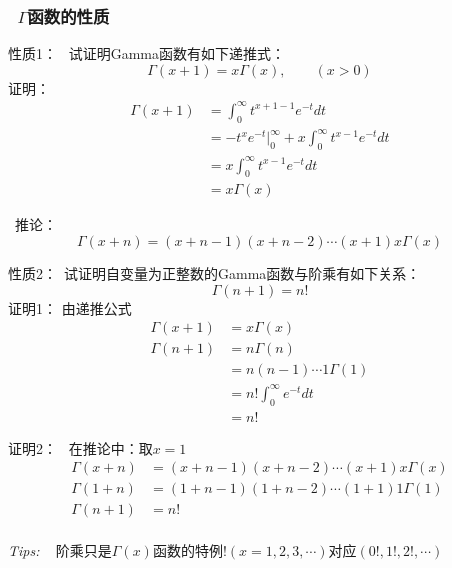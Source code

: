 \begin{frame}	
	\frametitle{~$\Gamma$函数的性质}
	\alert{性质1：} ~试证明Gamma函数有如下递推式：
		\[\Gamma(x+1)=x \Gamma(x),\qquad (x>0)\]
	\alert{证明：}  
	\begin{equation*}
	\begin{split}
		\Gamma(x+1)&= \int_{0}^{\infty} t^{x+1-1} e^{-t} dt \\
		&= -t^x e^{-t} |_0 ^\infty + x \int_{0}^{\infty} t^{x-1} e^{-t} dt \\
		&= x \int_{0}^{\infty} t^{x-1} e^{-t} dt \\
		&=x \Gamma(x)
	\end{split}
	\end{equation*}	
\end{frame}	

\begin{frame}
	 推论： 
	\begin{equation*}
		\Gamma(x+n)=(x+n-1)(x+n-2)\cdots (x+1)x\Gamma(x)
	\end{equation*}	 
\end{frame}	

\begin{frame}
	\alert{性质2：}~试证明自变量为正整数的Gamma函数与阶乘有如下关系：
	\begin{equation*}
		\Gamma(n+1)=n!
	\end{equation*}	
	\alert{证明1：}  由递推公式
	\begin{equation*}
	\begin{split}
		\Gamma(x+1)&=x \Gamma(x) \\
		\Gamma(n+1)&=n \Gamma(n) \\
		&=n(n-1)\cdots 1 \Gamma(1) \\
		&=n! \int_{0}^{\infty}  e^{-t} dt \\
		&=n!
	\end{split}
	\end{equation*}	
\end{frame}	

\begin{frame}
	\alert{证明2：}  	 在推论中：取$x=1$
	\begin{equation*}
	\begin{split}	
		\Gamma(x+n)&=(x+n-1)(x+n-2)\cdots (x+1)x\Gamma(x)\\
		\Gamma(1+n)&=(1+n-1)(1+n-2)\cdots (1+1)1\Gamma(1)\\
		\Gamma(n+1)&=n!
	\end{split}
	\end{equation*}	 
	~~\\ \vspace{4em}
\alert{\textit{Tips:\hspace{1em}}} ~ 阶乘只是$\Gamma(x)$函数的特例!$(x=1,2,3,\cdots)$对应$ (0!, 1!, 2!,\cdots)$
\end{frame}	


